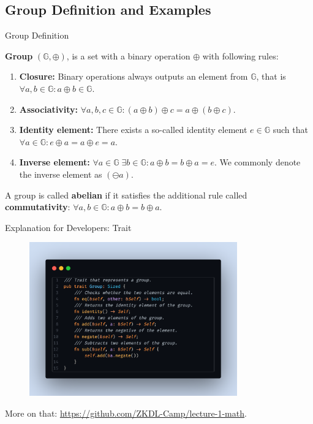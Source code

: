 \documentclass{beamer}
\begin{document}
    \subsection{Group Definition and Examples}
    \begin{frame}{Group Definition}
      \begin{definition}
        \textbf{Group} $(\mathbb{G}, \oplus)$, is a set with a binary operation $\oplus$ with following rules:
        \begin{enumerate}
            \item \textbf{Closure:} Binary operations always outputs an element from $\mathbb{G}$, that is $\forall a,b \in \mathbb{G}: a \oplus b \in \mathbb{G}$.\pause
            \item \textbf{Associativity:} $\forall a,b,c \in \mathbb{G}: (a \oplus b)\oplus c = a \oplus (b \oplus c)$.\pause
            \item \textbf{Identity element:} There exists a so-called identity element $e \in \mathbb{G}$ such that $\forall a \in \mathbb{G}: e \oplus a = a \oplus e = a$.\pause
            \item \textbf{Inverse element:} $\forall a \in \mathbb{G} \; \exists b \in \mathbb{G}: a\oplus b = b \oplus a = e$. We commonly denote the inverse element as $(\ominus a)$.
        \end{enumerate}
    \end{definition}

    \pause
    \begin{definition}
        A group is called \textbf{abelian} if it satisfies the additional rule called \textbf{commutativity}: $\forall a,b \in \mathbb{G}: a \oplus b = b \oplus a$.
    \end{definition}
    \end{frame}

    \begin{frame}{Explanation for Developers: Trait}
      \begin{center}
        \begin{figure}
          \includegraphics[width=0.8\textwidth]{images/lecture_1/group_in_rust.png}
          \label{fig:group_in_rust}
        \end{figure}

        More on that: \url{https://github.com/ZKDL-Camp/lecture-1-math}.
      \end{center}
    \end{frame}
\end{document}
